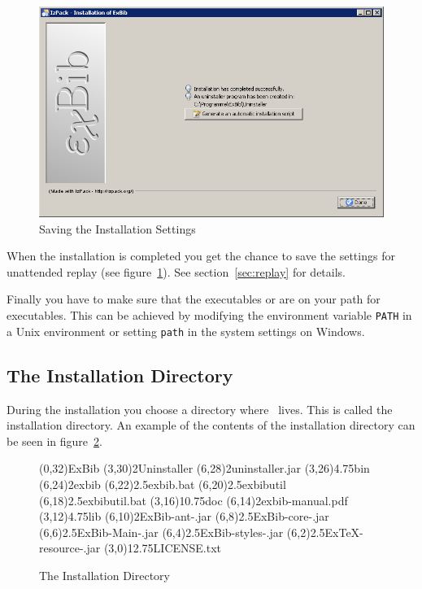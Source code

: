\begin{figure}[!ht]
  \centering
  \includegraphics[width=.45\textwidth]{img/inst8}
  \caption{Saving the Installation Settings}
  \label{fig:inst7}
\end{figure}

When the installation is completed you get the chance to save the
settings for unattended replay (see figure~\ref{fig:inst7}). See
section~\ref{sec:replay} for details.


Finally you have to make sure that the executables  or
 are on your path for executables. This
can be achieved by modifying the environment variable \verb|PATH| in a
Unix environment or setting \verb|path| in the system settings on
Windows.


\subsection{The Installation Directory}\label{sec:inst.dir}

During the installation you choose a directory where \ExBib\ lives.
This is called the installation directory. An example of the contents of the
installation directory can be seen in figure~\ref{fig:inst.dir}.

\begin{figure}[!ht]
  \centering
\begin{DirList}{200pt}{250pt}
  \TOPDIR(0,32){ExBib}
  \DIR(3,30)2{Uninstaller}
  \FILE(6,28)2{uninstaller.jar}
  \DIR(3,26){4.75}{bin}
  \FILE(6,24)2{exbib}
  \FILE(6,22){2.5}{exbib.bat}
  \FILE(6,20){2.5}{exbibutil}
  \FILE(6,18){2.5}{exbibutil.bat}
  \DIR(3,16){10.75}{doc}
  \FILE(6,14)2{exbib-manual.pdf}
  \DIR(3,12){4.75}{lib}
  \FILE(6,10){2}{ExBib-ant-\Version.jar}
  \FILE(6,8){2.5}{ExBib-core-\Version.jar}
  \FILE(6,6){2.5}{ExBib-Main-\Version.jar}
  \FILE(6,4){2.5}{ExBib-styles-\Version.jar}
  \FILE(6,2){2.5}{ExTeX-resource-\Version.jar}
  \FILE(3,0){12.75}{LICENSE.txt}
\end{DirList}
  \caption{The Installation Directory}

  \label{fig:inst.dir}
\end{figure}

